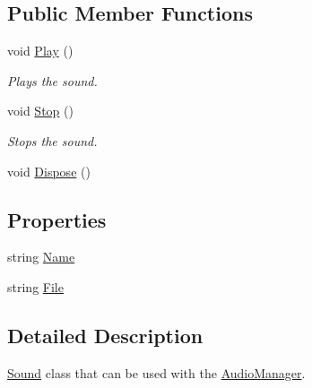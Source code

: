 \subsection*{Public Member Functions}
\begin{DoxyCompactItemize}
\item 
void \hyperlink{class_tri_devs_1_1_tri_engine_1_1_audio_1_1_sound_a6096422cfa0d22e1c70ae3ec1fc45db7}{Play} ()
\begin{DoxyCompactList}\small\item\em Plays the sound. \end{DoxyCompactList}\item 
void \hyperlink{class_tri_devs_1_1_tri_engine_1_1_audio_1_1_sound_ae1af6639ffcc741fc17b58322b3d955a}{Stop} ()
\begin{DoxyCompactList}\small\item\em Stops the sound. \end{DoxyCompactList}\item 
void \hyperlink{class_tri_devs_1_1_tri_engine_1_1_audio_1_1_sound_aedb0d3133142c6548b37b84dafe72ea9}{Dispose} ()
\end{DoxyCompactItemize}
\subsection*{Properties}
\begin{DoxyCompactItemize}
\item 
string \hyperlink{class_tri_devs_1_1_tri_engine_1_1_audio_1_1_sound_a92880ad36c670d83d8f587cd5a4bfe12}{Name}
\item 
string \hyperlink{class_tri_devs_1_1_tri_engine_1_1_audio_1_1_sound_a9d93a5a33cc4b95cf40feb88343598e8}{File}
\end{DoxyCompactItemize}


\subsection{Detailed Description}
\hyperlink{class_tri_devs_1_1_tri_engine_1_1_audio_1_1_sound}{Sound} class that can be used with the \hyperlink{class_tri_devs_1_1_tri_engine_1_1_audio_1_1_audio_manager}{Audio\-Manager}. 



